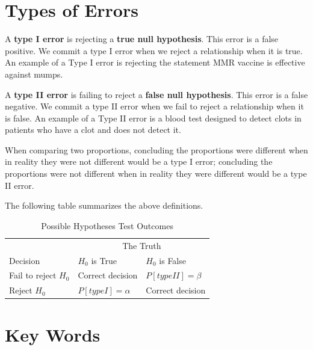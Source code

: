 \documentclass[11pt, chapterprefix=true]{scrbook}\usepackage[]{graphicx}\usepackage[]{color}
\begin{document}
\begin{itemize}
\end{itemize}

\section{Types of Errors}

A \textbf{type I error} is rejecting a \textbf{true null hypothesis}.  This error is a false positive.   We commit a type I error when we reject a relationship when it is true.  An example of a Type I error is rejecting the statement MMR vaccine is effective against mumps.

A \textbf{type II error} is failing to reject a \textbf{false null hypothesis}.  This error is a false negative.  We commit a type II error when we fail to reject a relationship when it is false.  An example of a Type II error is a blood test designed to detect clots in patients who have a clot and does not detect it.

When comparing two proportions, concluding the proportions were different when in reality they were not different would be a type I error; concluding the proportions were not different when in reality they were different would be a type II error. 

The following table summarizes the above definitions.

\begin{table}[ht]
\centering
\caption{Possible Hypotheses Test Outcomes}
\begin{tabular}{@{} p{3cm} p{3cm} p{3cm}  @{}}
 &   \multicolumn{2}{c}{The Truth} \\
 Decision & $H_0$ is True & $H_0$ is False \\ \hline
 Fail to reject $H_0$ & Correct decision & $P[type II] = \beta$ \\
 Reject $H_0$         & $P[type I] = \alpha$ & Correct decision \\ \hline
 \end{tabular}
 
 \end{table}
 


\section{Key Words}

\end{document}
